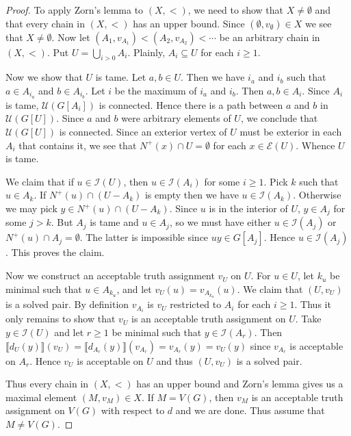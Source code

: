 \documentclass[12pt]{kluwer}
\theoremstyle{remark}
\newcommand{\fancy}[1]{\mathcal{#1}}
\def\I{\fancy{I}}
\def\U{\fancy{U}}
\def\E{\fancy{E}}
\begin{document}
\begin{proof}
To apply Zorn's lemma to $(X, <)$, we need to show that $X \neq \emptyset$ and that every chain in  $(X, <)$ has an upper bound. Since $(\emptyset, v_\emptyset) \in X$ we see that $X \neq \emptyset$.  Now let $(A_1, v_{A_1}) < (A_2, v_{A_2}) < \cdots$ be an arbitrary chain in $(X, <)$.  Put $U = \bigcup_{i > 0} A_i$.  Plainly, $A_i \subseteq U$ for each $i \geq 1$.\newline

Now we show that $U$ is tame.  Let $a, b \in U$. Then we have $i_a$ and $i_b$ such that $a \in A_{i_a}$ and $b \in A_{i_b}$. Let $i$ be the maximum of $i_a$ and $i_b$.  Then $a,b \in A_i$.  Since $A_i$ is tame, $\U(G[A_i])$ is connected.  Hence there is a path between $a$ and $b$ in $\U(G[U])$.  Since $a$ and $b$ were arbitrary elements of $U$, we conclude that $\U(G[U])$ is connected. Since an exterior vertex of $U$ must be exterior in each $A_i$ that contains it, we see that $N^+(x) \cap U = \emptyset$ for each $x \in \E(U)$.  Whence $U$ is tame.\newline

We claim that if $u \in \I(U)$, then $u \in \I(A_i)$ for some $i \geq 1$.  Pick $k$ such that $u \in A_k$.  If $N^+(u) \cap \left(U - A_k\right)$ is empty then we have $u \in \I(A_k)$. Otherwise we may pick $y \in N^+(u) \cap \left(U - A_k\right)$.  Since $u$ is in the interior of $U$, $y \in A_j$ for some $j > k$.  But $A_j$ is tame and $u \in A_j$, so we must have either $u \in \I(A_j)$ or $N^+(u) \cap A_j = \emptyset$. The latter is impossible since $uy \in G[A_j]$.  Hence $u \in \I(A_j)$. This proves the claim.\newline

Now we construct an acceptable truth assignment $v_U$ on $U$.  For $u \in U$, let $k_u$ be minimal such that $u \in A_{k_u}$, and let $v_U(u) = v_{A_{k_u}}(u)$. We claim that $(U, v_U)$ is a solved pair.  By definition $v_{A_i}$ is $v_U$ restricted to $A_i$ for each $i \geq 1$.  Thus it only remains to show that $v_U$ is an acceptable truth assignment on $U$.  Take $y \in \I(U)$ and let $r \geq 1$ be minimal such that $y \in \I(A_r)$.  Then $\llbracket d_U(y) \rrbracket(v_U) = \llbracket d_{A_r}(y) \rrbracket(v_{A_r}) = v_{A_r}(y) = v_U(y)$ since $v_{A_r}$ is acceptable on $A_r$.  Hence $v_U$ is acceptable on $U$ and thus $(U, v_U)$ is a solved pair.\newline

Thus every chain in $(X, <)$ has an upper bound and Zorn's lemma gives us a maximal element $(M, v_M) \in X$.  If $M = V(G)$, then $v_M$ is an acceptable truth assignment on $V(G)$ with respect to $d$ and we are done.  Thus assume that $M \neq V(G)$.\newline


\end{proof}
\end{document}

